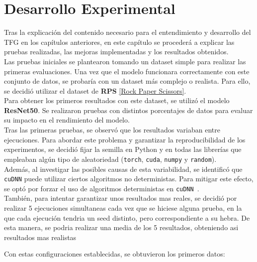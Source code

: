 \chapter{Desarrollo Experimental}\label{ch:desarrollo-experimental}

Tras la explicación del contenido necesario para el entendimiento y desarrollo del TFG en los capítulos anteriores, en
este capítulo se procederá a explicar las pruebas realizadas, las mejoras implementadas y los resultados obtenidos.
\\[6pt]

Las pruebas iniciales se plantearon tomando un dataset simple para realizar las primeras evaluaciones.
Una vez que el modelo funcionara correctamente con este conjunto de datos, se probaría con un dataset más complejo o
realista.
Para ello, se decidió utilizar el dataset de \textbf{RPS} \hyperref[subsec:rock-paper-scissors]{[Rock Paper Scissors]}.
\\[6pt]

Para obtener los primeros resultados con este dataset, se utilizó el modelo \textbf{ResNet50}.
Se realizaron pruebas con distintos porcentajes de datos para evaluar su impacto en el rendimiento del modelo. \\[6pt]

Tras las primeras pruebas, se observó que los resultados variaban entre ejecuciones.
Para abordar este problema y garantizar la reproducibilidad de los experimentos, se decidió fijar la semilla en Python
y en todas las librerías que empleaban algún tipo de aleatoriedad (\texttt{torch}, \texttt{cuda}, \texttt{numpy} y
\texttt{random}). \\[6pt]

Además, al investigar las posibles causas de esta variabilidad, se identificó que \texttt{cuDNN} puede utilizar ciertos
algoritmos no deterministas.
Para mitigar este efecto, se optó por forzar el uso de algoritmos deterministas en
\texttt{cuDNN}~\cite{noauthor_cublas_nodate}. \\[6pt]

También, para intentar garantizar unos resultados mas reales, se decidió por realizar 5 ejecuciones simultaneas cada
vez que se hiciese alguna prueba, en la que cada ejecución tendria un seed distinto, pero correspondiente a su hebra.
De esta manera, se podria realizar una media de los 5 resultados, obteniendo asi resultados mas realistas

Con estas configuraciones establecidas, se obtuvieron los primeros datos:


